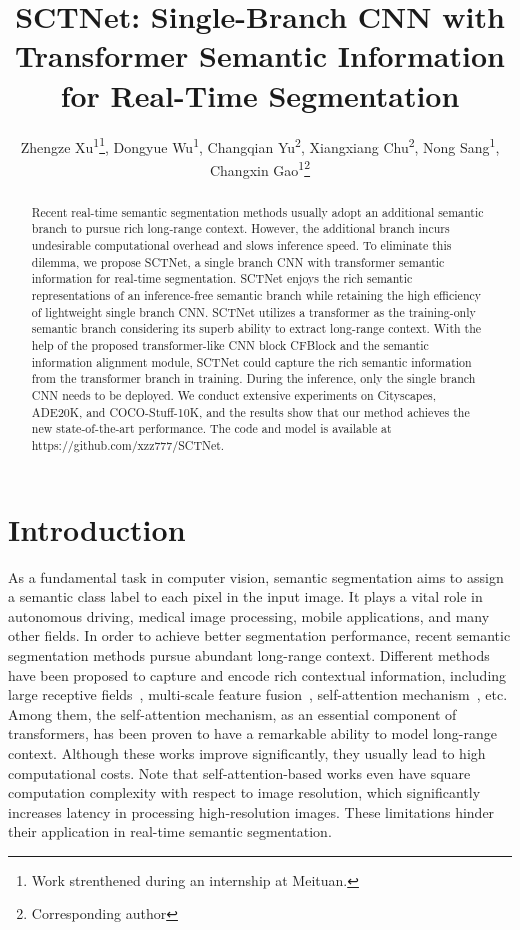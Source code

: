 \documentclass[letterpaper]{article} %
\title{SCTNet: Single-Branch CNN with Transformer Semantic Information for Real-Time Segmentation}
\author{
    Zhengze Xu\textsuperscript{\rm 1}\thanks{Work strenthened during an internship at Meituan.}, Dongyue Wu\textsuperscript{\rm 1}, Changqian Yu\textsuperscript{\rm 2}, Xiangxiang Chu\textsuperscript{\rm 2}, Nong Sang\textsuperscript{\rm 1}, Changxin Gao\textsuperscript{\rm 1}\thanks{Corresponding author}
}
\begin{document}
\maketitle

\begin{abstract}
Recent real-time semantic segmentation methods usually adopt an additional semantic branch to pursue rich long-range context. However, the additional branch incurs undesirable computational overhead and slows inference speed.
To eliminate this dilemma, we propose SCTNet, a single branch CNN with transformer semantic information for real-time segmentation. SCTNet enjoys the rich semantic representations of an inference-free semantic branch while retaining the high efficiency of lightweight single branch CNN.
SCTNet utilizes a transformer as the training-only semantic branch considering its superb ability to extract long-range context. With the help of the proposed transformer-like CNN block CFBlock and the semantic information alignment module, SCTNet could capture the rich semantic information from the transformer branch in training. During the inference, only the single branch CNN needs to be deployed. We conduct extensive experiments on Cityscapes, ADE20K, and COCO-Stuff-10K, and the results show that our method achieves the new state-of-the-art performance. The code and model is available at https://github.com/xzz777/SCTNet.
\end{abstract}

\section{Introduction}
As a fundamental task in computer vision, semantic segmentation aims to assign a semantic class label to each pixel in the input image. It plays a vital role in autonomous driving, medical image processing, mobile applications, and many other fields. In order to achieve better segmentation performance, recent semantic segmentation methods pursue abundant long-range context. Different methods have been proposed to capture and encode rich contextual information, including large receptive fields~\cite{chen2014semantic,chen2017deeplab,chen2018encoder}, multi-scale feature fusion~\cite{ronneberger2015u,zhao2017pyramid}, self-attention mechanism~\cite{fu2019dual,huang2019ccnet,yuan2018ocnet,zhao2018psanet,dosovitskiy2020image}, etc. Among them, the self-attention mechanism, as an essential component of transformers, has been proven to have a remarkable ability to model long-range context. Although these works improve significantly, they usually lead to high computational costs. Note that self-attention-based works even have square computation complexity with respect to image resolution, which significantly increases latency in processing high-resolution images. These limitations hinder their application in real-time semantic segmentation.
\end{document}
